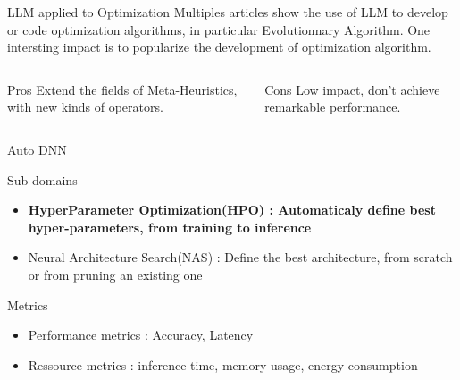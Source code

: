 \begin{frame}{LLM applied to Optimization}
    Multiples articles show the use of LLM to develop or code optimization algorithms, in particular Evolutionnary Algorithm. One intersting impact is to popularize the development of optimization algorithm.

    \begin{columns}
        
        \begin{column}[t]{0.45\textwidth}
            \begin{block}{Pros}
                Extend the fields of Meta-Heuristics, with new kinds of operators. 
                
            \end{block}

        \end{column}

        \begin{column}[t]{0.45\textwidth}
            \begin{block}{Cons}
                Low impact, don't achieve remarkable performance. 
            \end{block}

        \end{column}

    \end{columns}

    
\end{frame}

\begin{frame}{Auto DNN}
    \begin{block}{Sub-domains}
        \begin{itemize}
            \item \textbf{HyperParameter Optimization(HPO) : Automaticaly define best hyper-parameters, from training to inference} 
            \item Neural Architecture Search(NAS) : Define the best architecture, from scratch or from pruning an existing one
        \end{itemize}
        
    \end{block}


    \begin{block}{Metrics}
        \begin{itemize}
            \item Performance metrics : Accuracy, Latency
            \item Ressource metrics : inference time, memory usage, energy consumption
        \end{itemize}
        
    \end{block}
    
\end{frame}


